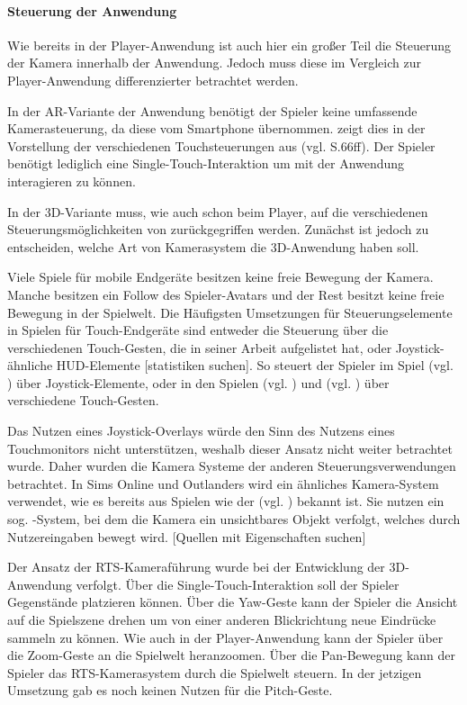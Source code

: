\paragraph{Steuerung der Anwendung}
Wie bereits in der Player-Anwendung ist auch hier ein großer Teil die Steuerung der Kamera innerhalb der Anwendung. Jedoch muss diese im Vergleich zur Player-Anwendung differenzierter betrachtet werden. 

In der \ac{AR}-Variante der Anwendung benötigt der Spieler keine umfassende Kamerasteuerung, da diese vom Smartphone  übernommen. \cite{reinhard_augmented_2022} zeigt dies in der Vorstellung der verschiedenen Touchsteuerungen aus (vgl. S.66ff). Der Spieler benötigt lediglich eine Single-Touch-Interaktion um mit der Anwendung interagieren zu können.

In der \ac{3D}-Variante muss, wie auch schon beim Player, auf die verschiedenen Steuerungsmöglichkeiten von \cite{reinhard_augmented_2022} zurückgegriffen werden. Zunächst ist jedoch zu entscheiden, welche Art von Kamerasystem die \ac{3D}-Anwendung haben soll. 

Viele Spiele für mobile Endgeräte besitzen keine freie Bewegung der Kamera. Manche besitzen ein Follow des Spieler-Avatars und der Rest besitzt keine freie Bewegung in der Spielwelt. Die Häufigsten Umsetzungen für Steuerungselemente in Spielen für Touch-Endgeräte sind entweder die Steuerung über die verschiedenen Touch-Gesten, die \cite{reinhard_augmented_2022} in seiner Arbeit aufgelistet hat, oder Joystick-ähnliche \ac{HUD}-Elemente [statistiken suchen]. 
So steuert der Spieler im Spiel  (vgl. \cite{noauthor_botworld_nodate}) über Joystick-Elemente, oder in den Spielen  (vgl. \cite{arts_sims_2017}) und  (vgl. \cite{noauthor_outlanders_2025}) über verschiedene Touch-Gesten. 

Das Nutzen eines Joystick-Overlays würde den Sinn des Nutzens eines Touchmonitors nicht unterstützen, weshalb dieser Ansatz nicht weiter betrachtet wurde. Daher wurden die Kamera Systeme der anderen Steuerungsverwendungen betrachtet. In Sims Online und Outlanders wird ein ähnliches Kamera-System verwendet, wie es bereits aus Spielen wie der  (vgl. \cite{noauthor_ubisoft_nodate}) bekannt ist. Sie nutzen ein sog. -System, bei dem die Kamera ein unsichtbares Objekt verfolgt, welches durch Nutzereingaben bewegt wird. [Quellen mit Eigenschaften suchen] 

Der Ansatz der \ac{RTS}-Kameraführung wurde bei der Entwicklung der \ac{3D}-Anwendung verfolgt. Über die Single-Touch-Interaktion soll der Spieler Gegenstände platzieren können. Über die Yaw-Geste kann der Spieler die Ansicht auf die Spielszene drehen um von einer anderen Blickrichtung neue Eindrücke sammeln zu können. Wie auch in der Player-Anwendung kann der Spieler über die Zoom-Geste an die Spielwelt heranzoomen. Über die Pan-Bewegung kann der Spieler das \ac{RTS}-Kamerasystem durch die Spielwelt steuern. In der jetzigen Umsetzung gab es noch keinen Nutzen für die Pitch-Geste.

